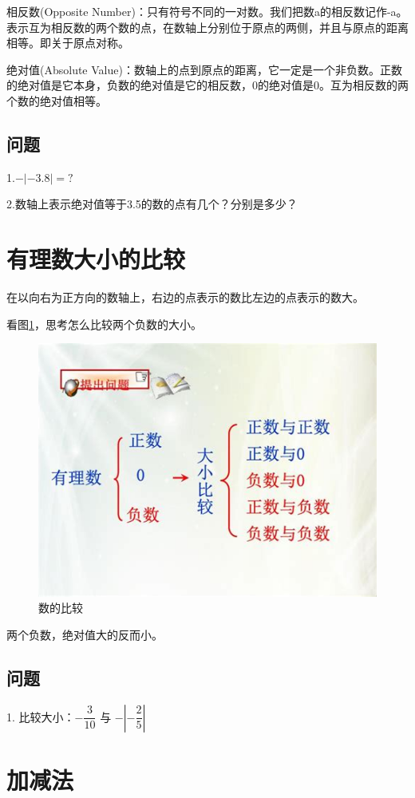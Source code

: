 \documentclass[UTF8,12pt]{ctexart}
\begin{document}
相反数(Opposite Number)：只有符号不同的一对数。我们把数a的相反数记作-a。表示互为相反数的两个数的点，在数轴上分别位于原点的两侧，并且与原点的距离相等。即关于原点对称。

绝对值(Absolute Value)：数轴上的点到原点的距离，它一定是一个非负数。正数的绝对值是它本身，负数的绝对值是它的相反数，0的绝对值是0。互为相反数的两个数的绝对值相等。

\subsection{问题}
1.\quad $ -|-3.8| = ? $

2.\quad 数轴上表示绝对值等于3.5的数的点有几个？分别是多少？

\newpage
\section{有理数大小的比较}

在以向右为正方向的数轴上，右边的点表示的数比左边的点表示的数大。

看图\ref{fig:number-comparison}，思考怎么比较两个负数的大小。

\begin{figure}[htb]
\centering
\includegraphics[width = .55\textwidth]{number-comparison.jpg}
\caption{数的比较}
\label{fig:number-comparison}
\end{figure}

两个负数，绝对值大的反而小。

\subsection{问题}
1. \quad 比较大小：$ -\dfrac{3}{10} $ 与 $ -|-\dfrac{2}{5}| $

\newpage
\section{加减法}
\end{document}
